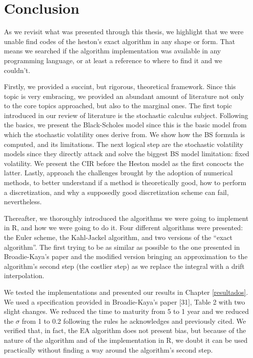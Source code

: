 \documentclass[12pt,twoside]{reedthesis}
\theoremstyle{definition}
\theoremstyle{definition}
\theoremstyle{remark}
\begin{document}
  \chapter{Conclusion}\label{conclusao}
  
  As we revisit what was presented through this thesis, we highlight that
  we were unable find codes of the heston's exact algorithm in any shape
  or form. That means we searched if the algorithm implementation was
  available in any programming language, or at least a reference to where
  to find it and we couldn't.
  
  Firstly, we provided a succint, but rigorous, theoretical framework.
  Since this topic is very embracing, we provided an abundant amount of
  literature not only to the core topics approached, but also to the
  marginal ones. The first topic introduced in our review of literature is
  the stochastic calculus subject. Following the basics, we present the
  Black-Scholes model since this is the basic model from which the
  stochastic volatility ones derive from. We show how the BS formula is
  computed, and its limitations. The next logical step are the stochastic
  volatility models since they directly attack and solve the biggest BS
  model limitation: fixed volatility. We present the CIR before the Heston
  model as the first concocts the latter. Lastly, approach the challenges
  brought by the adoption of numerical methods, to better understand if a
  method is theoretically good, how to perform a discretization, and why a
  supposedly good discretization scheme can fail, nevertheless.
  
  Thereafter, we thoroughly introduced the algorithms we were going to
  implement in R, and how we were going to do it. Four different
  algorithms were presented: the Euler scheme, the Kahl-Jackel algorithm,
  and two versions of the ``exact algorithm''. The first trying to be as
  similar as possible to the one presented in Broadie-Kaya's paper and the
  modified version bringing an approximation to the algorithm's second
  step (the costlier step) as we replace the integral with a drift
  interpolation.
  
  We tested the implementations and presented our results in Chapter
  \ref{resultados}. We used a specification provided in Broadie-Kaya's
  paper {[}31{]}, Table 2 with two slight changes. We reduced the time to
  maturity from 5 to 1 year and we reduced the \(\sigma\) from 1 to 0.2
  following the rules he acknowledges and previously cited. We verified
  that, in fact, the EA algorithm does not present bias, but because of
  the nature of the algorithm and of the implementation in R, we doubt it
  can be used practically without finding a way around the algorithm's
  second step.
  
\end{document}
